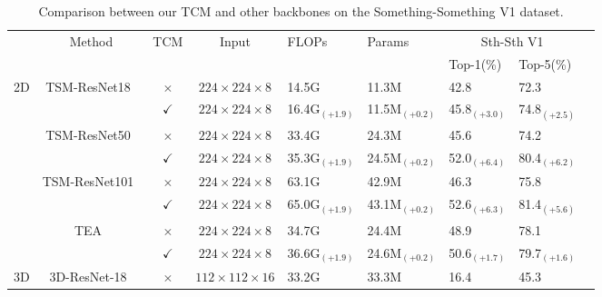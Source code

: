 \documentclass[journal]{IEEEtran}
\begin{document}
\begin{table*}[!ht]
\centering
\caption{Comparison between our TCM and other backbones on the Something-Something V1 dataset.}
\label{tab:diff_backbones}
\begin{tabular}{lccclllll}
\hline
                      & Method       & TCM          & Input & FLOPs            & Params   & \multicolumn{2}{c}{Sth-Sth V1}  \\
                             &                &              &       &                  &         & Top-1(\%)  & Top-5(\%)         \\ \hline
\multirow{8}{*}{2D}  & \multirow{2}{*}{TSM-ResNet18~\cite{wang2016temporal} }      & $\times$         & $224\times224\times8$     & 14.5G    & 11.3M   & 42.8           & 72.3                \\
                             &                & $\checkmark$ & $224\times224\times8$   & 16.4G$_{(+1.9)}$    & 11.5M$_{(+0.2)}$   & 45.8$_{(+3.0)}$  & 74.8$_{(+2.5)}$ \\ \cline{2-8}
                             & \multirow{2}{*}{TSM-ResNet50~\cite{wang2016temporal}}      &  $\times$       & $224\times224\times8$     & 33.4G    & 24.3M   & 45.6           & 74.2                \\
                             &                & $\checkmark$ & $224\times224\times8$   & 35.3G$_{(+1.9)}$    & 24.5M$_{(+0.2)}$   & 52.0$_{(+6.4)}$  & 80.4$_{(+6.2)}$ \\ \cline{2-8}
                             & \multirow{2}{*}{TSM-ResNet101~\cite{wang2016temporal}}     &  $\times$   & $224\times224\times8$     & 63.1G    & 42.9M   & 46.3           & 75.8                \\
                             &                & $\checkmark$ & $224\times224\times8$   & 65.0G$_{(+1.9)}$    & 43.1M$_{(+0.2)}$   & 52.6$_{(+6.3)}$  & 81.4$_{(+5.6)}$ \\ \cline{2-8}
  & \multirow{2}{*}{TEA~\cite{zhou2018temporal}}     &$\times$   & $224\times224\times8$     & 34.7G    & 24.4M      & 48.9       &  78.1               \\
                             &                & $\checkmark$ & $224\times224\times8$     & 36.6G$_{(+1.9)}$  & 24.6M$_{(+0.2)}$   & 50.6$_{(+1.7)}$   & 79.7$_{(+1.6)}$  \\ \hline
\multirow{8}{*}{3D}
&\multirow{2}{*}{3D-ResNet-18~\cite{hara2018can}}    & $\times$     & $112\times112\times16$    & 33.2G    & 33.3M    & 16.4       & 45.3                        \\

\end{tabular}
\end{table*}
\end{document}
